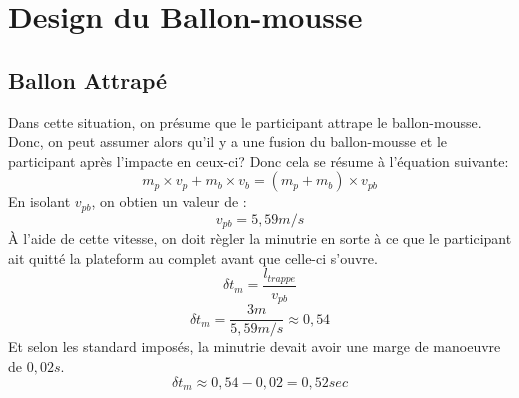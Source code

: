 \documentclass[12pt]{article}
\begin{document}
\section{Design du Ballon-mousse}
\subsection{Ballon Attrapé}
Dans cette situation, on présume que le participant attrape le ballon-mousse. Donc, on peut assumer alors qu'il y a une fusion du ballon-mousse et le participant après l'impacte en ceux-ci? Donc cela se résume à l'équation suivante:
\begin{equation}
m_p\times v_p + m_b\times v_b = (m_p + m_b)\times v_{pb}
\end{equation}
En isolant $v_{pb}$, on obtien un valeur de :
\begin{equation}
v_{pb} = 5,59m/s
\end{equation}
À l'aide de cette vitesse, on doit règler la minutrie en sorte à ce que le participant ait quitté la plateform au complet avant que celle-ci s'ouvre.
\begin{equation}
\delta t_m = \frac{l_{trappe}}{v_{pb}}
\end{equation}
\begin{equation}
\delta t_m = \frac{3m}{5,59m/s} \approx{0,54}
\end{equation}
Et selon les standard imposés, la minutrie devait avoir une marge de manoeuvre de $0,02s$.
\begin{equation}
\delta t_m \approx{0,54 - 0,02} = 0,52sec
\end{equation}
\end{document}
